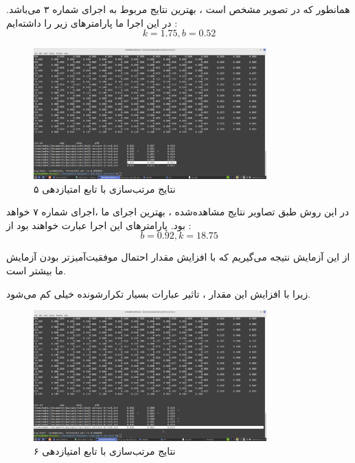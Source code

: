 \begin{boxM}
    همانطور که در تصویر مشخص است ، بهترین نتایج مربوط به اجرای شماره ۳ می‌باشد.
    در این اجرا ما پارامترهای زیر را داشته‌ایم :
    \begin{equation*}
        k = 1.75 , b = 0.52
    \end{equation*}
    
    
\end{boxM}

\newpage

\begin{figure}
    \centering
    \includegraphics[width=0.8\textwidth]{IR1/images/V5.png}
    \caption{نتایج مرتب‌سازی با تابع امتیازدهی ۵}
    \label{fig:enter-label}
\end{figure}

\begin{boxM}
    در این روش طبق تصاویر نتایج مشاهده‌شده ، بهترین اجرای ما ،اجرای شماره ۷ خواهد بود.
    پارامترهای این اجرا عبارت خواهند بود از :
    \begin{equation*}
        b = 0.92 , k = 18.75
    \end{equation*}

    از این آزمایش نتیجه می‌گیریم که با افزایش مقدار 
    احتمال موفقیت‌آمیزتر بودن آزمایش ما بیشتر است.

    زیرا با افزایش این مقدار ، تاثیر عبارات بسیار تکرارشونده خیلی کم می‌شود.
\end{boxM}

\newpage

\begin{figure}
    \centering
    \includegraphics[width=0.8\textwidth]{IR1/images/V6.png}
    \caption{نتایج مرتب‌سازی با تابع امتیازدهی ۶}
    \label{fig:enter-label}
\end{figure}

